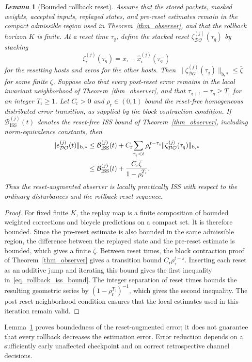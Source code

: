 \documentclass[letterpaper,journal]{IEEEtran}
\def\DO{\mathcal{DO}} %
\newtheorem{lemma}{\it Lemma}%
\begin{document}
\begin{lemma}[Bounded rollback reset]\label{lem_rollback_bounded}
Assume that the stored packets, masked weights, accepted inputs, replayed states, and pre-reset estimates remain in the compact admissible region used in Theorem~\ref{thm_observer}, and that the rollback horizon $K$ is finite. At a reset time $\tau_q$, define the stacked reset $\zeta_{\DO}^{(j)}(\tau_q)$ by stacking
\[
    \zeta_i^{(j)}(\tau_q)=x_{\mathrm r}-\hat{x}_i^{(j)}(\tau_q^-)
\]
for the resetting hosts and zeros for the other hosts. Then $\|\zeta_{\DO}^{(j)}(\tau_q)\|_{\mathrm{b},*}\le\bar\zeta$ for some finite $\bar\zeta$. Suppose also that every post-reset error remains in the local invariant neighborhood of Theorem~\ref{thm_observer}, and that $\tau_{q+1}-\tau_q\ge T_{\mathrm r}$ for an integer $T_{\mathrm r}\ge1$. Let $C_{\mathrm r}>0$ and $\rho_{\mathrm r}\in(0,1)$ bound the reset-free homogeneous distributed-error transition, as supplied by the block contraction condition. If $\mathcal B_{\mathrm{ISS}}^{(j)}(t)$ denotes the reset-free ISS bound of Theorem~\ref{thm_observer}, including norm-equivalence constants, then
\begin{align}
\|e_{\DO}^{(j)}(t)\|_{\mathrm{b},*}
&\le \mathcal B_{\mathrm{ISS}}^{(j)}(t)
+C_{\mathrm r}\!\sum_{\tau_q<t}\rho_{\mathrm r}^{\,t-\tau_q}
\|\zeta_{\DO}^{(j)}(\tau_q)\|_{\mathrm{b},*}\notag\\
&\le \mathcal B_{\mathrm{ISS}}^{(j)}(t)
+\frac{C_{\mathrm r}\bar\zeta}{1-\rho_{\mathrm r}^{T_{\mathrm r}}}.
\label{eq_rollback_iss_bound}
\end{align}
Thus the reset-augmented observer is locally practically ISS with respect to the ordinary disturbances and the rollback-reset sequence.
\end{lemma}
\begin{proof}
For fixed finite $K$, the replay map is a finite composition of bounded weighted corrections and bicycle predictions on a compact set. It is therefore bounded. Since the pre-reset estimate is also bounded in the same admissible region, the difference between the replayed state and the pre-reset estimate is bounded, which gives a finite $\bar\zeta$. Between reset times, the block contraction proof of Theorem~\ref{thm_observer} gives a transition bound $C_{\mathrm r}\rho_{\mathrm r}^{t-s}$. Inserting each reset as an additive jump and iterating this bound gives the first inequality in~\eqref{eq_rollback_iss_bound}. The integer separation of reset times bounds the resulting geometric series by $(1-\rho_{\mathrm r}^{T_{\mathrm r}})^{-1}$, which gives the second inequality. The post-reset neighborhood condition ensures that the local estimates used in this iteration remain valid.
\end{proof}
Lemma~\ref{lem_rollback_bounded} proves boundedness of the reset-augmented error; it does not guarantee that every rollback decreases the estimation error. Error reduction depends on a sufficiently early unaffected checkpoint and on correct retrospective channel decisions.
\end{document}
